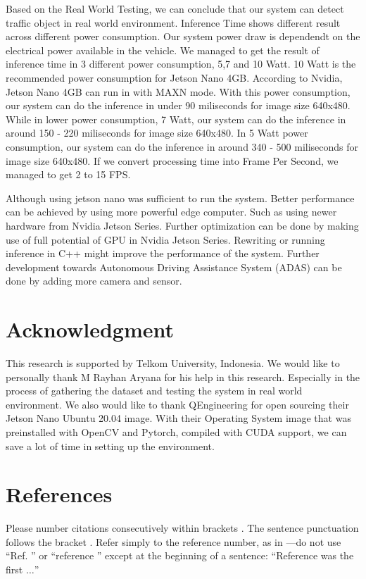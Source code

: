 \documentclass[conference]{IEEEtran}
\begin{document}
Based on the Real World Testing, we can conclude that our system can detect traffic object in real world environment. Inference Time shows different result across different power consumption.
Our system power draw is dependendt on the electrical power available in the vehicle. We managed to get the result of inference time in 3 different power consumption, 5,7 and 10 Watt.
10 Watt is the recommended power consumption for Jetson Nano 4GB. According to Nvidia, Jetson Nano 4GB can run in with MAXN mode. 
With this power consumption, our system can do the inference in under 90 miliseconds for image size 640x480.
While in lower power consumption, 7 Watt, our system can do the inference in around 150 - 220 miliseconds for image size 640x480.
In 5 Watt power consumption, our system can do the inference in around 340 - 500 miliseconds for image size 640x480.
If we convert processing time into Frame Per Second, we managed to get 2 to 15 FPS.


Although using jetson nano was sufficient to run the system. Better performance can be achieved by using more powerful edge computer. Such as using newer hardware from Nvidia Jetson Series. Further optimization can be done by making use of full potential of GPU in Nvidia Jetson Series. Rewriting or running inference in C++ might improve the performance of the system.
Further development towards Autonomous Driving Assistance System (ADAS) can be done by adding more camera and sensor.
\section*{Acknowledgment}
This research is supported by Telkom University, Indonesia.
We would like to personally thank M Rayhan Aryana for his help in this research.
Especially in the process of gathering the dataset and testing the system in real world environment.
We also would like to thank QEngineering for open sourcing their Jetson Nano Ubuntu 20.04 image. With their Operating System image that was preinstalled with OpenCV and Pytorch, compiled with CUDA support, we can save a lot of time in setting up the environment.


\section*{References}

Please number citations consecutively within brackets \cite{b1}. The 
sentence punctuation follows the bracket \cite{b2}. Refer simply to the reference 
number, as in \cite{b3}---do not use ``Ref. \cite{b3}'' or ``reference \cite{b3}'' except at 
the beginning of a sentence: ``Reference \cite{b3} was the first $\ldots$''
\end{document}
